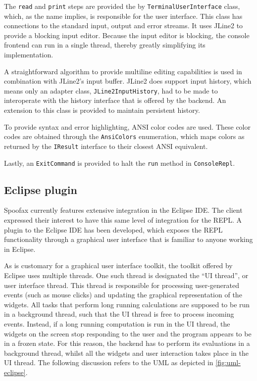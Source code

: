 The \texttt{read} and \texttt{print} steps are provided
the by \texttt{TerminalUserInterface} class, which, as the name implies, is
responsible for the user interface. This class has connections to the standard
input, output and error streams. It uses JLine2 to provide a blocking input
editor. Because the input editor is blocking, the console frontend can run in a
single thread, thereby greatly simplifying its implementation.

A straightforward algorithm to provide multiline editing capabilities is used in
combination with JLine2's input buffer.
JLine2 does support input history, which means only an adapter class,
\texttt{JLine2InputHistory}, had to be made to interoperate with the history
interface that is offered by the backend. An extension to this class is provided
to maintain persistent history.

To provide syntax and error highlighting, ANSI color codes are used. These
color codes are obtained through the \texttt{AnsiColors} enumeration, which
maps colors as returned by the \texttt{IResult} interface to their closest
ANSI equivalent.

Lastly, an \texttt{ExitCommand} is provided to halt the \texttt{run} method
in \texttt{ConsoleRepl}.

\subsection{Eclipse plugin}
\label{ssec:eclipse-plugin}

Spoofax currently features extensive integration in the Eclipse IDE. The client
expressed their interest to have this same level of integration for the REPL. A
plugin to the Eclipse IDE has been developed, which exposes the REPL
functionality through a graphical user interface that is familiar to anyone
working in Eclipse.

As is customary for a graphical user interface toolkit, the toolkit offered by
Eclipse uses multiple threads. One such thread is designated the ``UI thread'',
or user interface thread. This thread is responsible for processing
user-generated events (such as mouse clicks) and updating the graphical
representation of the widgets. All tasks that perform long running
calculations are supposed to be run in a background thread, such that the UI
thread is free to process incoming events. Instead, if a long running
computation is run in the UI thread, the widgets on the screen stop responding
to the user and the program appears to be in a frozen state. For this reason,
the backend has to perform its evaluations in a background thread, whilst all
the widgets and user interaction takes place in the UI thread.
The following discussion refers to the UML as depicted in
\cref{fig:uml-eclipse}.

